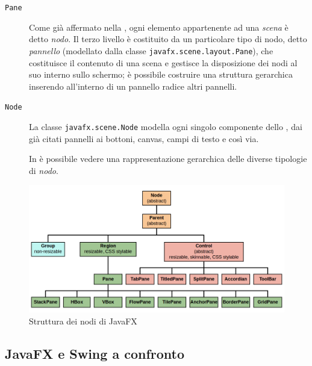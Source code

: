 \begin{description}
                \item[\texttt{Pane}]\label{itm:pane}
                    Come già affermato nella , ogni elemento appartenente ad una \emph{scena} è detto \emph{nodo}.
                    Il terzo livello è costituito da un particolare tipo di nodo, detto \emph{pannello} (modellato dalla classe \texttt{javafx\dothyp scene\dothyp layout\dothyp Pane}), che costituisce il contenuto di una scena e gestisce la disposizione dei nodi al suo interno sullo schermo;
                    è possibile costruire una struttura gerarchica inserendo all'interno di un pannello radice altri pannelli.

                \item[\texttt{Node}]\label{itm:nod}
                    La classe \texttt{javafx\dothyp scene\dothyp Node} modella ogni singolo componente dello , dai già citati pannelli ai bottoni, canvas, campi di testo e così via.

                    In  è possibile vedere una rappresentazione gerarchica delle diverse tipologie di \emph{nodo}.
            \end{description}

            \begin{figure}[htbp]
                \centering
                \includegraphics[scale=0.4]{img/Javafx-layout-classes}
                \caption{Struttura dei nodi di JavaFX}
                \label{fig:jfxNode}
            \end{figure}

        \subsection{JavaFX e Swing a confronto}\label{subsec:jfxVantaggi}

